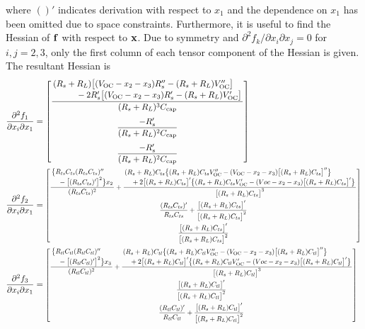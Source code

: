 \documentclass[../zhang_thesis.tex]{subfiles}
\begin{document}
where $()'$ indicates derivation with respect to $x_1$ and the dependence on $x_1$ has been omitted due to space constraints. Furthermore, it is useful to find the Hessian of $\mathbf{f}$ with respect to $\mathbf{x}$. Due to symmetry and $\partial^2 f_k/\partial x_i\partial x_j = 0$ for $i,j=2,3$, only the first column of each tensor component of the Hessian is given. The resultant Hessian is
\begin{align}
    \frac{\partial^2 f_1}{\partial x_i \partial x_1} & = \begin{bmatrix}
            \dfrac{\splitfrac{(R_s+R_L)\big[(V_\text{OC}-x_2-x_3)R_s''-(R_s+R_L)V_\text{OC}''\big]}{- 2R_s' \big[(V_\text{OC}-x_2-x_3)R_s' - (R_s+R_L)V_\text{OC}'\big]}}{(R_s+R_L)^3 C_\text{cap}} \\[3ex]
            \dfrac{-R_s'}{(R_s+R_L)^2 C_\text{cap}} \\[3ex]
            \dfrac{-R_s'}{(R_s+R_L)^2 C_\text{cap}}
        \end{bmatrix} \\
    \frac{\partial^2 f_2}{\partial x_i \partial x_1} & = \scalemath{0.8}{ \begin{bmatrix}
            \dfrac{\splitfrac{\big\{R_{ts}C_{ts}(R_{ts}C_{ts})''}{- \big[(R_{ts}C_{ts})'\big]^2\big\}x_2}}{(R_{ts}C_{ts})^2} + \dfrac{\splitfrac{(R_s+R_L)C_{ts}\big\{(R_s+R_L)C_{ts}V_\text{OC}'' - (V_\text{OC}-x_2-x_3)\big[(R_s+R_L)C_{ts}\big]''\big\}}{+ 2 \big[(R_s+R_L)C_{ts}\big]' \big\{(R_s+R_L)C_{ts}V_\text{OC}' - (Voc-x_2-x_3)\big[(R_s+R_L)C_{ts}\big]'\big\}}}{\big[(R_s+R_L)C_{ts}\big]^3} \\[3ex]
            \dfrac{(R_{ts}C_{ts})'}{R_{ts}C_{ts}}+\dfrac{\big[(R_s+R_L)C_{ts}\big]'}{\big[(R_s+R_L)C_{ts}\big]^2} \\[3ex]
            \dfrac{\big[(R_s+R_L)C_{ts}\big]'}{\big[(R_s+R_L)C_{ts}\big]^2}
        \end{bmatrix} } \\
    \frac{\partial^2 f_3}{\partial x_i \partial x_1} & = \scalemath{0.8}{ \begin{bmatrix}
            \dfrac{\splitfrac{\big\{R_{tl}C_{tl}(R_{tl}C_{tl})''}{- \big[(R_{tl}C_{tl})'\big]^2\big\}x_3}}{(R_{tl}C_{tl})^2} + \dfrac{\splitfrac{(R_s+R_L)C_{tl}\big\{(R_s+R_L)C_{tl}V_\text{OC}'' - (V_\text{OC}-x_2-x_3)\big[(R_s+R_L)C_{tl}\big]''\big\}}{+ 2 \big[(R_s+R_L)C_{tl}\big]' \big\{(R_s+R_L)C_{tl}V_\text{OC}' - (Voc-x_2-x_3)\big[(R_s+R_L)C_{tl}\big]'\big\}}}{\big[(R_s+R_L)C_{tl}\big]^3} \\[3ex]
            \dfrac{\big[(R_s+R_L)C_{tl}\big]'}{\big[(R_s+R_L)C_{tl}\big]^2} \\[3ex]
            \dfrac{(R_{tl}C_{tl})'}{R_{tl}C_{tl}}+\dfrac{\big[(R_s+R_L)C_{tl}\big]'}{\big[(R_s+R_L)C_{tl}\big]^2}
        \end{bmatrix} }
\end{align}
\end{document}
